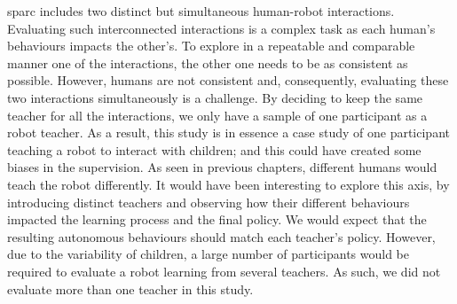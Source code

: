 \gls{sparc} includes two distinct but simultaneous human-robot interactions. Evaluating such interconnected interactions is a complex task as each human's behaviours impacts the other's. To explore in a repeatable and comparable manner one of the interactions, the other one needs to be as consistent as possible. However, humans are not consistent and, consequently, evaluating these two interactions simultaneously is a challenge. By deciding to keep the same teacher for all the interactions, we only have a sample of one participant as a robot teacher. As a result, this study is in essence a case study of one participant teaching a robot to interact with children; and this could have created some biases in the supervision. As seen in previous chapters, different humans would teach the robot differently. It would have been interesting to explore this axis, by introducing distinct teachers and observing how their different behaviours impacted the learning process and the final policy. We would expect that the resulting autonomous behaviours should match each teacher's policy. However, due to the variability of children, a large number of participants would be required to evaluate a robot learning from several teachers. As such, we did not evaluate more than one teacher in this study.
%


